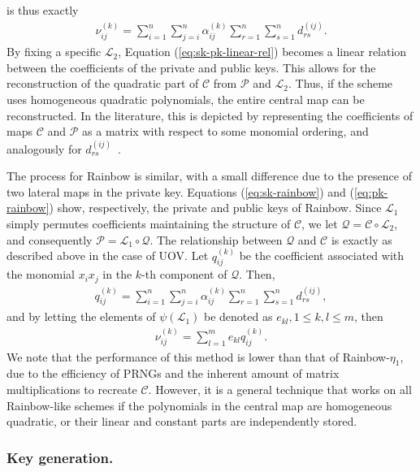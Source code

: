 \documentclass[english]{ufsc-thesis-rn46-2019/ufsc-thesis-rn46-2019}
\theoremstyle{definition}
\begin{document}
is thus exactly
\begin{align}\label{eq:sk-pk-linear-rel}
  \nu_{ij}^{(k)}
    = \sum_{i = 1}^{n} \sum_{j = i}^{n}
      \alpha_{ij}^{(k)} \sum_{r = 1}^{n} \sum_{s = 1}^{n} d_{rs}^{(ij)}.
\end{align}
By fixing a specific $\mathcal{L}_{2}$, Equation (\ref{eq:sk-pk-linear-rel})
becomes a linear relation between the coefficients of the private and public
keys. This allows for the reconstruction of the quadratic part of $\mathcal{C}$
from $\mathcal{P}$ and $\mathcal{L}_{2}$. Thus, if the scheme uses homogeneous
quadratic polynomials, the entire central map can be reconstructed. In the
literature, this is depicted by representing the coefficients of maps
$\mathcal{C}$ and $\mathcal{P}$ as a matrix with respect to some monomial
ordering, and analogously for $d_{rs}^{(ij)}$~\cite[p.~94]{Petzoldt:201307}.

The process for Rainbow is similar, with a small difference due to the presence
of two lateral maps in the private key. Equations (\ref{eq:sk-rainbow}) and
(\ref{eq:pk-rainbow}) show, respectively, the private and public keys of
Rainbow. Since $\mathcal{L}_{1}$ simply permutes coefficients maintaining the
structure of $\mathcal{C}$, we let
$\mathcal{Q} = \mathcal{C} \circ \mathcal{L}_{2}$, and consequently
$\mathcal{P} = \mathcal{L}_{1} \circ \mathcal{Q}$. The relationship between
$\mathcal{Q}$ and $\mathcal{C}$ is exactly as described above in the case of
UOV\@. Let $q_{ij}^{(k)}$ be the coefficient associated with the monomial
$x_{i} x_{j}$ in the $k$-th component of $\mathcal{Q}$. Then,
\begin{align}
  q_{ij}^{(k)}
    = \sum_{i = 1}^{n} \sum_{j = i}^{n} \alpha_{ij}^{(k)}
      \sum_{r = 1}^{n} \sum_{s = 1}^{n} d_{rs}^{(ij)},
\end{align}
and by letting the elements of $\psi(\mathcal{L}_{1})$ be denoted as
$e_{kl}, 1 \leq k, l \leq m$, then
\begin{align}
  \nu_{ij}^{(k)} = \sum_{l = 1}^{m} e_{kl} q_{ij}^{(k)}.
\end{align}
We note that the performance of this method is lower than that of
Rainbow-$\eta_{1}$, due to the efficiency of PRNGs and the inherent amount of
matrix multiplications to recreate $\mathcal{C}$. However, it is a general
technique that works on all Rainbow-like schemes if the polynomials in the
central map are homogeneous quadratic, or their linear and constant parts are
independently stored.

\subsubsection{Key generation.}
\end{document}
